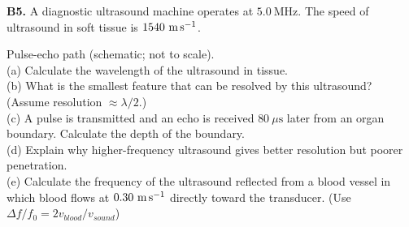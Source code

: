 \begin{exercisebox}[18]
\vspace{0.4cm}

\textbf{B5.} A diagnostic ultrasound machine
operates at $5.0\ \text{MHz}$. The speed of
ultrasound in soft tissue is $1540\ \text{m\,s}^{-1}$.\\[4pt]
\begin{center}
\end{center}
\small Pulse-echo path (schematic; not to scale).\\[4pt]
(a) Calculate the wavelength of the ultrasound
in tissue.\\
(b) What is the smallest feature that can be
resolved by this ultrasound? (Assume resolution
$\approx \lambda/2$.)\\
(c) A pulse is transmitted and an echo is received
$80\ \mu\text{s}$ later from an organ boundary.
Calculate the depth of the boundary.\\
(d) Explain why higher-frequency ultrasound gives
better resolution but poorer penetration.\\
(e) Calculate the frequency of the ultrasound
reflected from a blood vessel in which blood flows
at $0.30\ \text{m\,s}^{-1}$ directly toward the
transducer. (Use $\Delta f/f_0 = 2v_{blood}/v_{sound}$)
\hfill{}

\end{exercisebox}
